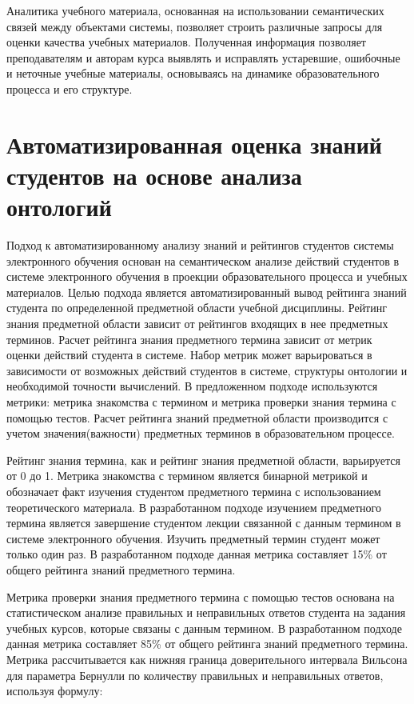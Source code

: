 Аналитика учебного материала, основанная на использовании семантических связей между объектами системы, позволяет строить различные запросы для оценки качества учебных материалов. Полученная информация позволяет преподавателям и авторам курса выявлять и исправлять устаревшие, ошибочные и неточные учебные материалы, основываясь на динамике образовательного процесса и его структуре.



\section{Автоматизированная оценка знаний студентов на основе анализа онтологий} \label{sect3_5}

Подход к автоматизированному анализу знаний и рейтингов студентов системы электронного обучения основан на семантическом анализе действий студентов в системе электронного обучения в проекции образовательного процесса и учебных материалов. Целью подхода является автоматизированный вывод рейтинга знаний студента по определенной предметной области учебной дисциплины. Рейтинг знания предметной области зависит от рейтингов входящих в нее предметных терминов. Расчет рейтинга знания предметного термина зависит от метрик оценки действий студента в системе. Набор метрик может варьироваться в зависимости от возможных действий студентов в системе, структуры онтологии и необходимой точности вычислений. В предложенном подходе используются метрики: метрика знакомства с термином и метрика проверки знания термина с помощью тестов. Расчет рейтинга знаний предметной области производится с учетом значения(важности) предметных терминов в образовательном процессе.

Рейтинг знания термина, как и рейтинг знания предметной области, варьируется от 0 до 1. Метрика знакомства с термином является бинарной метрикой и обозначает факт изучения студентом предметного термина с использованием теоретического материала. В разработанном подходе изучением предметного термина является завершение студентом лекции связанной с данным термином в системе электронного обучения. Изучить предметный термин студент может только один раз. В разработанном подходе данная метрика составляет 15\% от общего рейтинга знаний предметного термина.

Метрика проверки знания предметного термина с помощью тестов основана на статистическом анализе правильных и неправильных ответов студента на задания учебных курсов, которые связаны с данным термином. В разработанном подходе данная метрика составляет 85\% от общего рейтинга знаний предметного термина. Метрика рассчитывается как нижняя граница доверительного интервала Вильсона для параметра Бернулли по количеству правильных и неправильных ответов, используя формулу:

